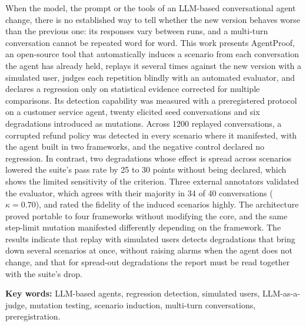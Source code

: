\clearpage
\blank
{}
\begingroup\dobleesp
\vspace{6pt}
When the model, the prompt or the tools of an LLM-based conversational agent change, there is no established way to tell whether the new version behaves worse than the previous one: its responses vary between runs, and a multi-turn conversation cannot be repeated word for word. This work presents AgentProof, an open-source tool that automatically induces a scenario from each conversation the agent has already held, replays it several times against the new version with a simulated user, judges each repetition blindly with an automated evaluator, and declares a regression only on statistical evidence corrected for multiple comparisons. Its detection capability was measured with a preregistered protocol on a customer service agent, twenty elicited seed conversations and six degradations introduced as mutations. Across 1200 replayed conversations, a corrupted refund policy was detected in every scenario where it manifested, with the agent built in two frameworks, and the negative control declared no regression. In contrast, two degradations whose effect is spread across scenarios lowered the suite's pass rate by 25 to 30 points without being declared, which shows the limited sensitivity of the criterion. Three external annotators validated the evaluator, which agrees with their majority in 34 of 40 conversations ($\kappa = 0.70$), and rated the fidelity of the induced scenarios highly. The architecture proved portable to four frameworks without modifying the core, and the same step-limit mutation manifested differently depending on the framework. The results indicate that replay with simulated users detects degradations that bring down several scenarios at once, without raising alarms when the agent does not change, and that for spread-out degradations the report must be read together with the suite's drop.
\par\vspace{6pt}
\textbf{Key words:} LLM-based agents, regression detection, simulated users, LLM-as-a-judge, mutation testing, scenario induction, multi-turn conversations, preregistration.
\par
\endgroup
